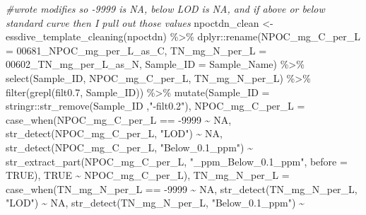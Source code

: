 \documentclass[
]{article}
\newenvironment{Shaded}{\begin{snugshade}}{\end{snugshade}}
\newcommand{\AttributeTok}[1]{\textcolor[rgb]{0.77,0.63,0.00}{#1}}
\newcommand{\CommentTok}[1]{\textcolor[rgb]{0.56,0.35,0.01}{\textit{#1}}}
\newcommand{\ConstantTok}[1]{\textcolor[rgb]{0.00,0.00,0.00}{#1}}
\newcommand{\DecValTok}[1]{\textcolor[rgb]{0.00,0.00,0.81}{#1}}
\newcommand{\FunctionTok}[1]{\textcolor[rgb]{0.00,0.00,0.00}{#1}}
\newcommand{\NormalTok}[1]{#1}
\newcommand{\OtherTok}[1]{\textcolor[rgb]{0.56,0.35,0.01}{#1}}
\newcommand{\SpecialCharTok}[1]{\textcolor[rgb]{0.00,0.00,0.00}{#1}}
\newcommand{\StringTok}[1]{\textcolor[rgb]{0.31,0.60,0.02}{#1}}
\begin{document}
\begin{Shaded}
\begin{Highlighting}[]
\CommentTok{\#wrote modifies so {-}9999 is NA, below LOD is NA, and if above or below standard curve then I pull out those values}
\NormalTok{npoctdn\_clean }\OtherTok{\textless{}{-}} \FunctionTok{essdive\_template\_cleaning}\NormalTok{(npoctdn) }\SpecialCharTok{\%\textgreater{}\%}
\NormalTok{  dplyr}\SpecialCharTok{::}\FunctionTok{rename}\NormalTok{(}\AttributeTok{NPOC\_mg\_C\_per\_L =} \StringTok{\textasciigrave{}}\AttributeTok{00681\_NPOC\_mg\_per\_L\_as\_C}\StringTok{\textasciigrave{}}\NormalTok{,}
         \AttributeTok{TN\_mg\_N\_per\_L =} \StringTok{\textasciigrave{}}\AttributeTok{00602\_TN\_mg\_per\_L\_as\_N}\StringTok{\textasciigrave{}}\NormalTok{,}
         \AttributeTok{Sample\_ID =}\NormalTok{ Sample\_Name) }\SpecialCharTok{\%\textgreater{}\%}
  \FunctionTok{select}\NormalTok{(Sample\_ID, NPOC\_mg\_C\_per\_L, TN\_mg\_N\_per\_L) }\SpecialCharTok{\%\textgreater{}\%}
  \FunctionTok{filter}\NormalTok{(}\FunctionTok{grepl}\NormalTok{(}\StringTok{\textquotesingle{}filt0.7\textquotesingle{}}\NormalTok{, Sample\_ID)) }\SpecialCharTok{\%\textgreater{}\%}
  \FunctionTok{mutate}\NormalTok{(}\AttributeTok{Sample\_ID =}\NormalTok{ stringr}\SpecialCharTok{::}\FunctionTok{str\_remove}\NormalTok{(Sample\_ID ,}\StringTok{"{-}filt0.2"}\NormalTok{),}
         \AttributeTok{NPOC\_mg\_C\_per\_L =} \FunctionTok{case\_when}\NormalTok{(NPOC\_mg\_C\_per\_L }\SpecialCharTok{==} \SpecialCharTok{{-}}\DecValTok{9999} \SpecialCharTok{\textasciitilde{}} \ConstantTok{NA}\NormalTok{,}
                              \FunctionTok{str\_detect}\NormalTok{(NPOC\_mg\_C\_per\_L, }\StringTok{"LOD"}\NormalTok{) }\SpecialCharTok{\textasciitilde{}} \ConstantTok{NA}\NormalTok{,}
                              \FunctionTok{str\_detect}\NormalTok{(NPOC\_mg\_C\_per\_L, }\StringTok{"Below\_0.1\_ppm"}\NormalTok{) }\SpecialCharTok{\textasciitilde{}}
                                      \FunctionTok{str\_extract\_part}\NormalTok{(NPOC\_mg\_C\_per\_L, }\StringTok{"\_ppm\_Below\_0.1\_ppm"}\NormalTok{, }\AttributeTok{before =} \ConstantTok{TRUE}\NormalTok{),}
                               \ConstantTok{TRUE} \SpecialCharTok{\textasciitilde{}}\NormalTok{ NPOC\_mg\_C\_per\_L),}
         \AttributeTok{TN\_mg\_N\_per\_L =} \FunctionTok{case\_when}\NormalTok{(TN\_mg\_N\_per\_L }\SpecialCharTok{==} \SpecialCharTok{{-}}\DecValTok{9999} \SpecialCharTok{\textasciitilde{}} \ConstantTok{NA}\NormalTok{,}
                              \FunctionTok{str\_detect}\NormalTok{(TN\_mg\_N\_per\_L, }\StringTok{"LOD"}\NormalTok{) }\SpecialCharTok{\textasciitilde{}} \ConstantTok{NA}\NormalTok{,}
                              \FunctionTok{str\_detect}\NormalTok{(TN\_mg\_N\_per\_L, }\StringTok{"Below\_0.1\_ppm"}\NormalTok{) }\SpecialCharTok{\textasciitilde{}} 

\end{Highlighting}
\end{Shaded}
\end{document}
